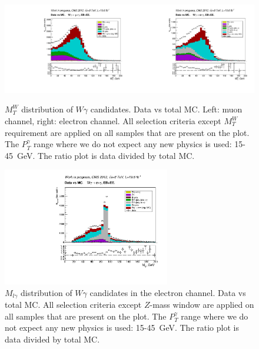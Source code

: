 \begin{figure}[htb]
  \begin{center}
   \includegraphics[width=0.5\textwidth]{../figs/figs_v11/MUON_WGamma/PrepareYields/c_TotalDATAvsMC_EtaCommon__WMtVERY_PRELIMINARY.pdf}\includegraphics[width=0.5\textwidth]{../figs/figs_v11/ELECTRON_WGamma/PrepareYields/c_TotalDATAvsMC_EtaCommon__WMtVERY_PRELIMINARY.pdf}
  \caption{$M_T^W$ distribution of $W\gamma$ candidates. Data vs total MC. Left: muon channel, right: electron channel. All selection criteria except $M_{T}^W$ requirement are applied on all samples that are present on the plot. The $P_T^{\gamma}$ range where we do not expect any new physics is used: 15-45~GeV. The ratio plot is data divided by total MC. }
  \label{fig:DATAvsMC_WMt}
  \end{center}
\end{figure}

\begin{figure}[htb]
  \begin{center}
   \includegraphics[width=0.65\textwidth]{../figs/figs_v11/ELECTRON_WGamma/PrepareYields/c_TotalDATAvsMC_EtaCommon__Mpholep1PRELIMINARY_FOR_E_TO_GAMMA_WITH_PSV_CUT.pdf}
  \caption{$M_{l\gamma}$ distribution of $W\gamma$ candidates in the electron channel. Data vs total MC. All selection criteria except $Z$-mass window are applied on all samples that are present on the plot. The $P_T^{\gamma}$ range where we do not expect any new physics is used: 15-45~GeV. The ratio plot is data divided by total MC.}
  \label{fig:DATAvsMC_Mpholep1}
  \end{center}
\end{figure}


